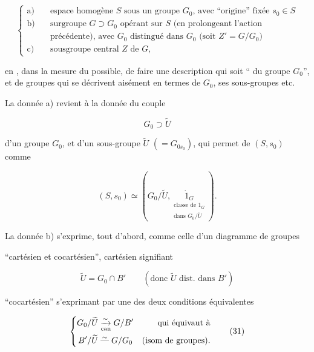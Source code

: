 \[
\left\{\begin{aligned}
\text{a)}\quad&\text{espace homogène $S$ sous un groupe $G_0$, avec ``origine'' fixée $s_0\in S$}\\
\text{b)}\quad&\text{surgroupe $G\supset G_0$ opérant sur $S$ (en prolongeant l'action}\\
 &\text{précédente), avec $G_0$ distingué dans $G_0$ (soit $Z'=G/G_0$)}\\
\text{c)}\quad&\text{sousgroupe central $Z$ de $G$,}
\end{aligned}\right.\tag*{(26)}
\]


en , dans la mesure du possible, de faire une description qui soit `` du groupe $G_0$'', et de groupes qui se décrivent aisément en termes de $G_0$,  ses sous-groupes etc.

La donnée a) revient à la donnée du couple

\[ G_0\supset\widetilde U \tag*{(27)} \]

d'un groupe $G_0$, et d'un sous-groupe $\widetilde U$ $(=G_{0s_0})$, qui permet de  $(S,s_0)$ comme

\[ (S,s_0)\simeq(G_0/\widetilde U,\underset{\substack{\text{classe de }1_G\\\text{dans }G_0/\widetilde U}}{\dot{1}_G}). \tag*{(28)} \]

La donnée b) s'exprime, tout d'abord, comme celle d'un diagramme de groupes


``cartésien et cocartésien'', cartésien signifiant

\[ \widetilde U=G_0\cap B'\qquad(\text{donc }\widetilde U\text{ dist. dans }B') \tag*{(30)} \]

``cocartésien'' s'exprimant par une des deux conditions équivalentes

\[
\left\{\begin{aligned}
G_0/\widetilde U&\underset{\rm can}{\xrightarrow{\sim}}G/B' &\text{qui équivaut à}\\
B'/\widetilde U&\mathrel{\overset{\sim}{\text{---}}}G/G_0 &\text{(isom de groupes).}
\end{aligned}\right.\tag*{(31)}
\]

